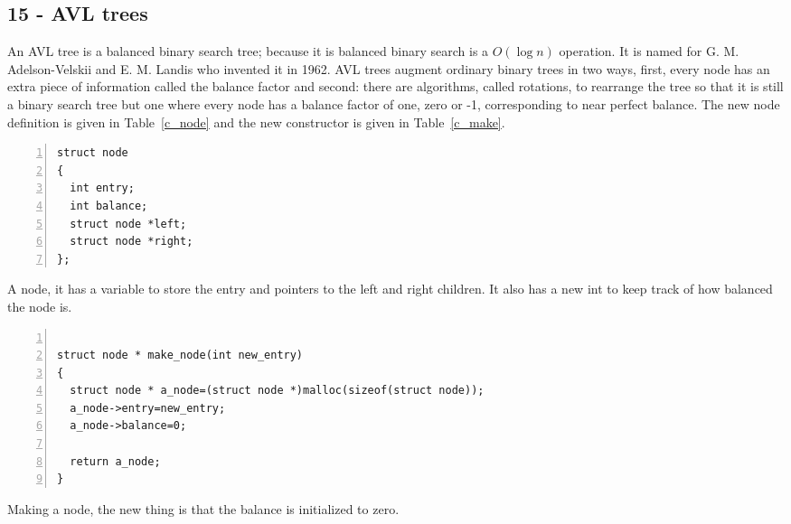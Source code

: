 \documentclass[11pt,a4paper]{scrartcl}
\begin{document}

\subsection*{15 - AVL trees}

An AVL tree is a balanced binary search tree; because it is balanced
binary search is a $O(\log{n})$ operation. It is named for
G. M. Adelson-Velskii and E. M. Landis who invented it in 1962. AVL
trees augment ordinary binary trees in two ways, first, every node has
an extra piece of information called the balance factor and second:
there are algorithms, called rotations, to rearrange the tree so that
it is still a binary search tree but one where every node has a
balance factor of one, zero or -1, corresponding to near perfect
balance. The new node definition is given in Table~\ref{c_node} and
the new constructor is given in Table~\ref{c_make}.

\begin{table}[b]
\begin{lstlisting}[numbers=left]
struct node
{
  int entry;
  int balance;
  struct node *left;
  struct node *right;
};
\end{lstlisting}
\caption{A node, it has a variable to store the entry and pointers to
  the left and right children. It also has a new int to keep track of
  how balanced the node is.\label{c_node}}
\end{table}


\begin{table}
\begin{lstlisting}[numbers=left]

struct node * make_node(int new_entry)
{
  struct node * a_node=(struct node *)malloc(sizeof(struct node));
  a_node->entry=new_entry;
  a_node->balance=0;

  return a_node;
}
\end{lstlisting}
\caption{Making a node, the new thing is that the balance is initialized to zero.\label{c_make}}
\end{table}
\end{document}
